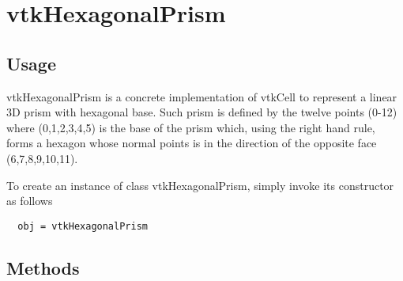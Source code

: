 \section{vtkHexagonalPrism}

\subsection{Usage}

 vtkHexagonalPrism is a concrete implementation of vtkCell to represent a
 linear 3D prism with hexagonal base. Such prism is defined by the twelve points 
 (0-12) where (0,1,2,3,4,5) is the base of the prism which, using the right
 hand rule, forms a hexagon whose normal points is in the direction of the
 opposite face (6,7,8,9,10,11).

To create an instance of class vtkHexagonalPrism, simply
invoke its constructor as follows
\begin{verbatim}
  obj = vtkHexagonalPrism
\end{verbatim}
\subsection{Methods}

